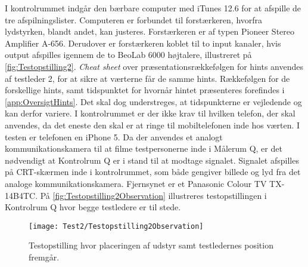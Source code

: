 %
I kontrolrummet indgår den bærbare computer med iTunes 12.6 for at afspille de tre afspilningslister. Computeren er forbundet til forstærkeren, hvorfra lydstyrken, blandt andet, kan justeres. Forstærkeren er af typen Pioneer Stereo Amplifier A-656. Derudover er forstærkeren koblet til to input kanaler, hvis output afspilles igennem de to BeoLab 6000 højtalere, illustreret på \autoref{fig:Testopstilling2}. \textit{Cheat sheet} over præsentationsrækkefølgen for hints anvendes af testleder 2, for at sikre at værterne får de samme hints. Rækkefølgen for de forskellige hints, samt tidspunktet for hvornår hintet præsenteres forefindes i \autoref{app:OversigtHints}. Det skal dog understreges, at tidspunkterne er vejledende og kan derfor variere. I kontrolrummet er der ikke krav til hvilken telefon, der skal anvendes, da det eneste den skal er at ringe til mobiltelefonen inde hos værten. I testen er telefonen en iPhone 5. Da der anvendes et analogt kommunikationskamera til at filme testpersonerne inde i Målerum Q, er det nødvendigt at Kontrolrum Q er i stand til at modtage signalet. Signalet afspilles på CRT-skærmen inde i kontrolrummet, som både gengiver billede og lyd fra det analoge kommunikationskamera. Fjernsynet er et Panasonic Colour TV TX-14B4TC. På \autoref{fig:Testopstilling2Observation} illustreres testopstillingen i Kontrolrum Q hvor begge testledere er til stede.   
%
\begin{figure}[H]
	\centering
	\texttt{[image: Test2/Testopstilling2Observation]}
	\caption{Testopstilling hvor placeringen af udstyr samt testledernes position fremgår.}
	\label{fig:Testopstilling2Observation}
\end{figure}
\noindent
% 


